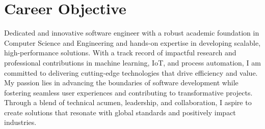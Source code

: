 \section{\textbf{Career Objective}}
Dedicated and innovative software engineer with a robust academic foundation in Computer Science and Engineering and hands-on expertise in developing scalable, high-performance solutions. With a track record of impactful research and professional contributions in machine learning, IoT, and process automation, I am committed to delivering cutting-edge technologies that drive efficiency and value. My passion lies in advancing the boundaries of software development while fostering seamless user experiences and contributing to transformative projects. Through a blend of technical acumen, leadership, and collaboration, I aspire to create solutions that resonate with global standards and positively impact industries.
